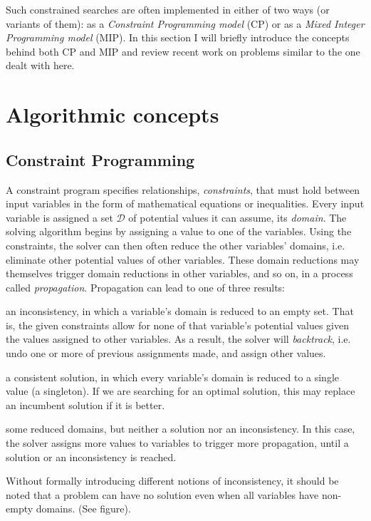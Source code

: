 \documentclass[13pt, letterpaper, oneside]{book}
\begin{document}
Such constrained searches are often implemented in either of two ways (or
variants of them): as a \textit{Constraint Programming model} (CP) or as a
\textit{Mixed Integer Programming model} (MIP). In this section I will briefly
introduce the concepts behind both CP and MIP and review recent work on problems
similar to the one dealt with here.

\section{Algorithmic concepts}
\subsection{Constraint Programming}
A constraint program specifies relationships, \textit{constraints}, that must
hold between input variables in the form of mathematical equations or
inequalities. Every input variable is assigned a set $\mathcal{D}$ of potential
values it can assume, its \textit{domain}. The solving algorithm begins by
assigning a value to one of the variables. Using the constraints, the solver can
then often reduce the other variables' domains, i.e. eliminate other potential
values of other variables. These domain reductions may themselves trigger domain
reductions in other variables, and so on, in a process called
\textit{propagation}. Propagation can lead to one of three results:
\begin{alist}
\item{an inconsistency, in which a variable's domain is reduced to an empty set.
That is, the given constraints allow for none of that variable's
potential values given the values assigned to other variables. As a result, the
solver will \textit{backtrack}, i.e. undo one or more of previous assignments
made, and assign other values.}
\item{a consistent solution, in which every variable's domain is reduced to a single value
(a singleton). If we are searching for an optimal solution, this may replace an
incumbent solution if it is better.}
\item{some reduced domains, but neither a solution nor an inconsistency. In this
case, the solver assigns more values to variables to trigger more propagation,
until a solution or an inconsistency is reached.}
\end{alist}

Without formally introducing different notions of inconsistency, it should be
noted that a problem can have no solution even when all variables have
non-empty domains. (See figure).
\end{document}

